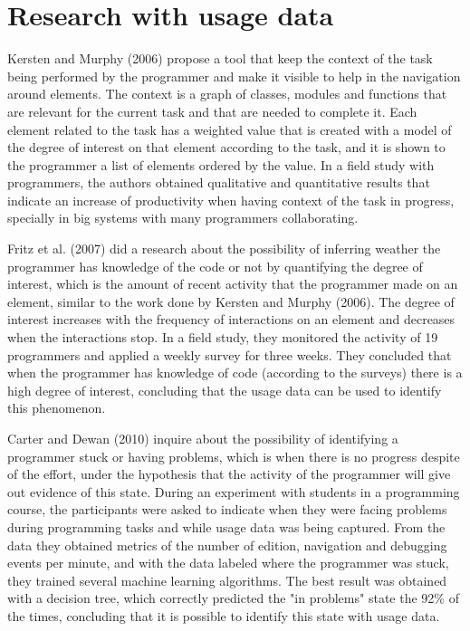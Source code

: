 \section{Research with usage data}
Kersten and Murphy (2006) propose a tool that keep the context of the task being performed by the programmer and make it visible to help in the navigation around elements. The context is a graph of classes, modules and functions that are relevant for the current task and that are needed to complete it. Each element related to the task has a weighted value that is created with a model of the degree of interest on that element according to the task, and it is shown to the programmer a list of elements ordered by the value. In a field study with programmers, the authors obtained qualitative and quantitative results that indicate an increase of productivity when having context of the task in progress, specially in big systems with many programmers collaborating.

Fritz et al. (2007) did a research about the possibility of inferring weather the programmer has knowledge of the code or not by quantifying the degree of interest, which is the amount of recent activity that the programmer made on an element, similar to the work done by Kersten and Murphy (2006). The degree of interest increases with the frequency of interactions on an element and decreases when the interactions stop. In a field study, they monitored the activity of 19 programmers and applied a weekly survey for three weeks. They concluded that when the programmer has knowledge of code (according to the surveys) there is a high degree of interest, concluding that the usage data can be used to identify this phenomenon.

Carter and Dewan (2010) inquire about the possibility of identifying a programmer stuck or having problems, which is when there is no progress despite of the effort, under the hypothesis that the activity of the programmer will give out evidence of this state. During an experiment with students in a programming course, the participants were asked to indicate when they were facing problems during programming tasks and while usage data was being captured. From the data they obtained metrics of the number of edition, navigation and debugging events per minute, and with the data labeled where the programmer was stuck, they trained several machine learning algorithms. The best result was obtained with a decision tree, which correctly predicted the "in problems" state the 92\% of the times, concluding that it is possible to identify this state with usage data.

